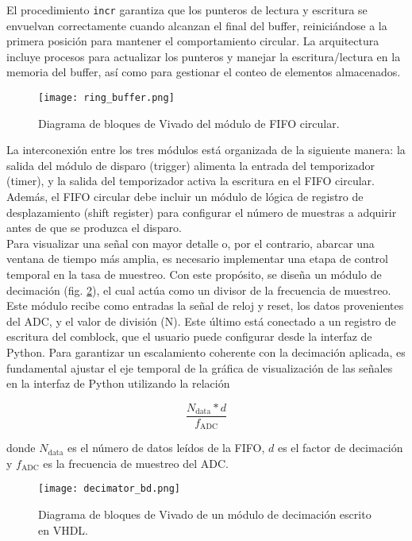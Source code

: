 \documentclass{report}
\begin{document}
\noindent El procedimiento \texttt{incr} garantiza que los punteros de lectura y escritura se envuelvan correctamente cuando alcanzan el final del buffer, reiniciándose a la primera posición para mantener el comportamiento circular. La arquitectura incluye procesos para actualizar los punteros y manejar la escritura/lectura en la memoria del buffer, así como para gestionar el conteo de elementos almacenados.

\begin{figure}[H]
    \centering
    \texttt{[image: ring\_buffer.png]}
    \caption{Diagrama de bloques de Vivado del módulo de FIFO circular.}
    \label{fig:fifo_circular}
\end{figure}

\noindent La interconexión entre los tres módulos está organizada de la siguiente manera: la salida del módulo de disparo (trigger) alimenta la entrada del temporizador (timer), y la salida del temporizador activa la escritura en el FIFO circular. Además, el FIFO circular debe incluir un módulo de lógica de registro de desplazamiento (shift register) para configurar el número de muestras a adquirir antes de que se produzca el disparo.\\

\noindent Para visualizar una señal con mayor detalle o, por el contrario, abarcar una ventana de tiempo más amplia, es necesario implementar una etapa de control temporal en la tasa de muestreo. Con este propósito, se diseña un módulo de decimación (fig. \ref{fig:decimator_bd}), el cual actúa como un divisor de la frecuencia de muestreo. Este módulo recibe como entradas la señal de reloj y reset, los datos provenientes del ADC, y el valor de división (N). Este último está conectado a un registro de escritura del comblock, que el usuario puede configurar desde la interfaz de Python. Para garantizar un escalamiento coherente con la decimación aplicada, es fundamental ajustar el eje temporal de la gráfica de visualización de las señales en la interfaz de Python utilizando la relación

\begin{equation}
    \frac{N_{\text{data}}*d}{f_{\text{ADC}}}
\end{equation}

\noindent donde $N_{\text{data}}$ es el número de datos leídos de la FIFO, $d$ es el factor de decimación y $f_{\text{ADC}}$ es la frecuencia de muestreo del ADC.\\

\begin{figure}[h]
    \centering
    \texttt{[image: decimator\_bd.png]}
    \caption{Diagrama de bloques de Vivado de un módulo de decimación escrito en VHDL.}
    \label{fig:decimator_bd}
\end{figure}
\end{document}
